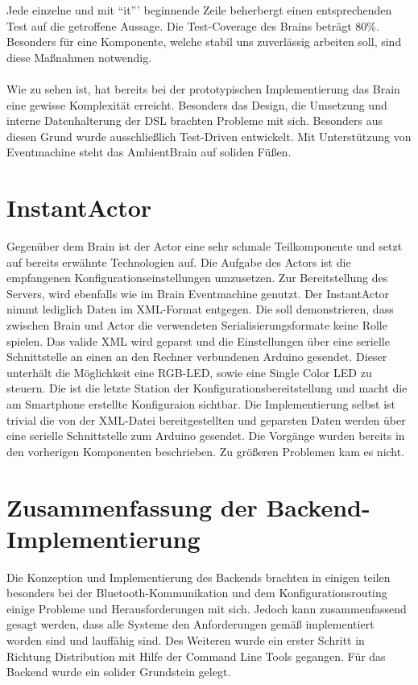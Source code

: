 Jede einzelne und mit "`it"'' beginnende Zeile beherbergt einen entsprechenden Test auf die getroffene Aussage. Die Test-Coverage des Brains beträgt 80\%. Besonders für eine Komponente, welche stabil uns zuverlässig arbeiten soll, sind diese Maßnahmen notwendig. 
\\\\
Wie zu sehen ist, hat bereits bei der prototypischen Implementierung das Brain eine gewisse Komplexität erreicht. Besonders das Design, die Umsetzung und interne Datenhalterung der DSL brachten Probleme mit sich. Besonders aus diesen Grund wurde ausschließlich Test-Driven entwickelt. Mit Unterstützung von Eventmachine steht das AmbientBrain auf soliden Füßen. 
\section{InstantActor}
Gegenüber dem Brain ist der Actor eine sehr schmale Teilkomponente und setzt auf bereits erwähnte Technologien auf. 
Die Aufgabe des Actors ist die empfangenen Konfigurationseinstellungen umzusetzen. Zur Bereitstellung des Servers, wird ebenfalls wie im Brain Eventmachine genutzt. Der InstantActor nimmt lediglich Daten im XML-Format entgegen. Die soll demonstrieren, dass zwischen Brain und Actor die verwendeten Serialisierungsformate keine Rolle spielen. Das valide XML wird geparst und die Einstellungen über eine serielle Schnittstelle an einen an den Rechner verbundenen Arduino gesendet. Dieser unterhält die Möglichkeit eine RGB-LED, sowie eine Single Color LED zu steuern. Die ist die letzte Station der Konfigurationsbereitstellung und macht die am Smartphone erstellte Konfiguraion sichtbar. Die Implementierung selbst ist trivial die von der XML-Datei bereitgestellten und geparsten Daten werden über eine serielle Schnittstelle zum Arduino gesendet. Die Vorgänge wurden bereits in den vorherigen Komponenten beschrieben. Zu größeren Problemen kam es nicht. 

\section{Zusammenfassung der Backend-Implementierung}
Die Konzeption und Implementierung des Backends brachten in einigen teilen besonders bei der Bluetooth-Kommunikation und dem Konfigurationsrouting einige Probleme und Herausforderungen mit sich. Jedoch kann zusammenfassend gesagt werden, dass alle Systeme den Anforderungen gemäß implementiert worden sind und lauffähig sind. Des Weiteren wurde ein erster Schritt in Richtung Distribution mit Hilfe der Command Line Tools gegangen. Für das Backend wurde ein solider Grundstein gelegt. 

